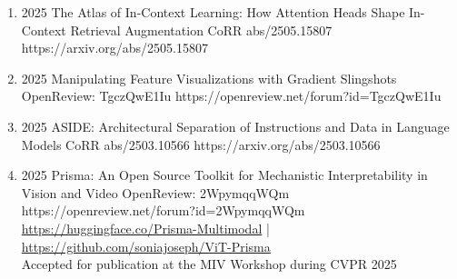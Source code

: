 {\begin{enumerate}
             
        \item {}
                        {2025}
                        {The Atlas of In-Context Learning: How Attention Heads Shape In-Context Retrieval Augmentation}
                        {CoRR abs/2505.15807}
                        {https://arxiv.org/abs/2505.15807}
                        {
                      
                        }
                        
                        
                        
    
        \item {}
                        {2025}
                        {Manipulating Feature Visualizations with Gradient Slingshots}
                        {OpenReview: TgczQwE1Iu}
                        {https://openreview.net/forum?id=TgczQwE1Iu}    
    
    
        \item {}
                        {2025}
                        {ASIDE: Architectural Separation of Instructions and Data in Language Models}
                        {CoRR abs/2503.10566}
                        {https://arxiv.org/abs/2503.10566}    

                        
        \item {}
                        {2025}
                        {Prisma: An Open Source Toolkit for Mechanistic Interpretability in Vision and Video}
                        {OpenReview: 2WpymqqWQm}
                        {https://openreview.net/forum?id=2WpymqqWQm}
                        {
                            \\\href{https://huggingface.co/Prisma-Multimodal}{https://huggingface.co/Prisma-Multimodal} | \href{https://github.com/soniajoseph/ViT-Prisma}{https://github.com/soniajoseph/ViT-Prisma}
                            \\ Accepted for publication at the MIV Workshop during CVPR 2025
                        }

                        
        




\end{enumerate}}
